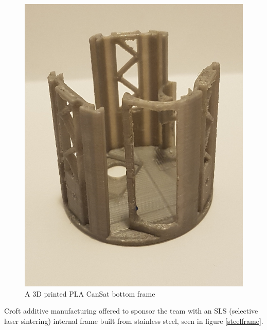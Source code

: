 \documentclass[]{report}
\begin{document}
\begin{figure}[h]
	\hfill\includegraphics[scale=0.15]{pla_frame.jpg}\hspace*{\fill}
	\caption{A 3D printed PLA CanSat bottom frame}
	\label{plaframe}
\end{figure}


Croft additive manufacturing offered to sponsor the team with an SLS (selective laser sintering) internal frame built from stainless steel, seen in figure \ref{steelframe}.
\end{document}
